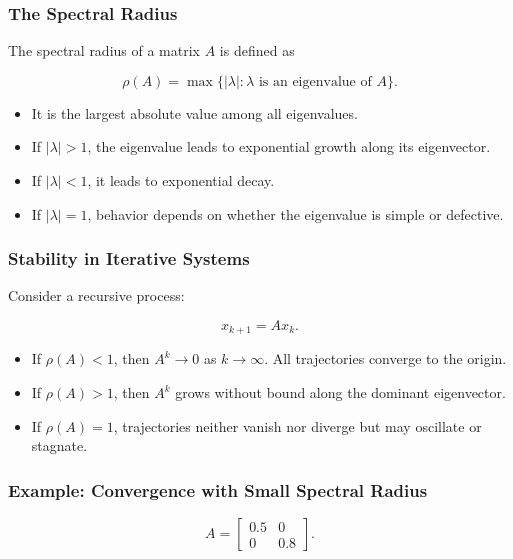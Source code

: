 \documentclass[
  letterpaper,
  DIV=11,
  numbers=noendperiod]{scrreprt}
\providecommand{\tightlist}{%
  \setlength{\itemsep}{0pt}\setlength{\parskip}{0pt}}
\begin{document}
\subsubsection{The Spectral Radius}\label{the-spectral-radius}

The spectral radius of a matrix \(A\) is defined as

\[
\rho(A) = \max \{ |\lambda| : \lambda \text{ is an eigenvalue of } A \}.
\]

\begin{itemize}
\tightlist
\item
  It is the largest absolute value among all eigenvalues.
\item
  If \(|\lambda| > 1\), the eigenvalue leads to exponential growth along
  its eigenvector.
\item
  If \(|\lambda| < 1\), it leads to exponential decay.
\item
  If \(|\lambda| = 1\), behavior depends on whether the eigenvalue is
  simple or defective.
\end{itemize}

\subsubsection{Stability in Iterative
Systems}\label{stability-in-iterative-systems}

Consider a recursive process:

\[
x_{k+1} = A x_k.
\]

\begin{itemize}
\tightlist
\item
  If \(\rho(A) < 1\), then \(A^k \to 0\) as \(k \to \infty\). All
  trajectories converge to the origin.
\item
  If \(\rho(A) > 1\), then \(A^k\) grows without bound along the
  dominant eigenvector.
\item
  If \(\rho(A) = 1\), trajectories neither vanish nor diverge but may
  oscillate or stagnate.
\end{itemize}

\subsubsection{Example: Convergence with Small Spectral
Radius}\label{example-convergence-with-small-spectral-radius}

\[
A = \begin{bmatrix} 0.5 & 0 \\ 0 & 0.8 \end{bmatrix}.
\]
\end{document}
